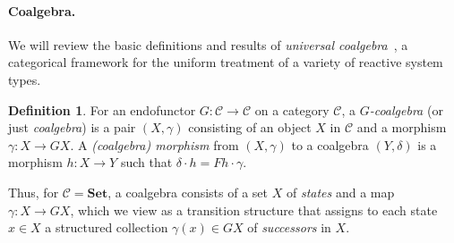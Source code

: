 \documentclass[sigconf,
			final%
			nonacm
                        ]{acmart}
\numberwithin{equation}{section}
\numberwithin{equation}{section}
\theoremstyle{plain}
\theoremstyle{definition}
\newtheorem{defn}[thm]{Definition}
\newcommand{\CatC}{\mathscr{C}}           %
\newcommand{\Set}{\mathbf{Set}}
\DeclareMathOperator{\Coalg}{\mathsf{Coalg}}
\begin{document}
\paragraph*{Coalgebra.}
 We will review the
basic definitions and results of \emph{universal
coalgebra}~\cite{Rutten00}, a categorical framework for the uniform
treatment of a variety of reactive system types.
%
\begin{defn}
  For an endofunctor $G\colon\CatC\to\CatC$ on a
  category $\CatC$, a \emph{$G$-coalgebra} (or just
  \emph{coalgebra}) is a pair $(X, \gamma)$ consisting
  of an object $X$ in $\CatC$ and a morphism
  $\gamma\colon X\to GX$.
  A \emph{(coalgebra) morphism} from $(X, \gamma)$ to
  a coalgebra $(Y, \delta)$ is a morphism $h\colon X\to Y$
  such that $\delta\cdot h = Fh\cdot\gamma$.
\end{defn}
%
\noindent Thus, for $\CatC = \Set$, a coalgebra consists of a set $X$
of \emph{states} and a map $\gamma\colon X\to GX$, which we view as a
transition structure that assigns to each state $x\in X$ a structured
collection $\gamma(x)\in GX$ of \emph{successors} in $X$.
%
\end{document}

